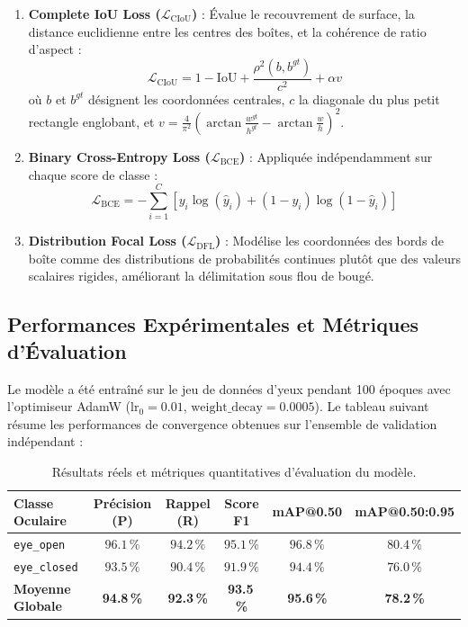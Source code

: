 \documentclass[11pt,a4paper]{article}
\begin{document}
\begin{enumerate}
    \item \textbf{Complete IoU Loss ($\mathcal{L}_{\text{CIoU}}$)} : Évalue le recouvrement de surface, la distance euclidienne entre les centres des boîtes, et la cohérence de ratio d'aspect :
    \begin{equation}
        \mathcal{L}_{\text{CIoU}} = 1 - \text{IoU} + \frac{\rho^2(b, b^{gt})}{c^2} + \alpha v
    \end{equation}
    où $b$ et $b^{gt}$ désignent les coordonnées centrales, $c$ la diagonale du plus petit rectangle englobant, et $v = \frac{4}{\pi^2} \left( \arctan\frac{w^{gt}}{h^{gt}} - \arctan\frac{w}{h} \right)^2$.
    \item \textbf{Binary Cross-Entropy Loss ($\mathcal{L}_{\text{BCE}}$)} : Appliquée indépendamment sur chaque score de classe :
    \begin{equation}
        \mathcal{L}_{\text{BCE}} = -\sum_{i=1}^C \left[ y_i \log(\hat{y}_i) + (1 - y_i)\log(1 - \hat{y}_i) \right]
    \end{equation}
    \item \textbf{Distribution Focal Loss ($\mathcal{L}_{\text{DFL}}$)} : Modélise les coordonnées des bords de boîte comme des distributions de probabilités continues plutôt que des valeurs scalaires rigides, améliorant la délimitation sous flou de bougé.
\end{enumerate}

\subsection{Performances Expérimentales et Métriques d'Évaluation}
Le modèle a été entraîné sur le jeu de données d'yeux pendant 100 époques avec l'optimiseur AdamW ($\text{lr}_0 = 0.01$, $\text{weight\_decay} = 0.0005$). Le tableau suivant résume les performances de convergence obtenues sur l'ensemble de validation indépendant :

\begin{table}[H]
\centering
\small
\begin{tabularx}{\textwidth}{l c c c c c}
\toprule
\textbf{Classe Oculaire} & \textbf{Précision (P)} & \textbf{Rappel (R)} & \textbf{Score F1} & \textbf{mAP@0.50} & \textbf{mAP@0.50:0.95} \\
\midrule
\texttt{eye\_open}   & $96.1\,\%$ & $94.2\,\%$ & $95.1\,\%$ & $96.8\,\%$ & $80.4\,\%$ \\
\texttt{eye\_closed} & $93.5\,\%$ & $90.4\,\%$ & $91.9\,\%$ & $94.4\,\%$ & $76.0\,\%$ \\
\midrule
\textbf{Moyenne Globale} & \textbf{94.8\,\%} & \textbf{92.3\,\%} & \textbf{93.5\,\%} & \textbf{95.6\,\%} & \textbf{78.2\,\%} \\
\bottomrule
\end{tabularx}
\caption{Résultats réels et métriques quantitatives d'évaluation du modèle.}
\label{tab:metrics_table}
\end{table}
\end{document}
